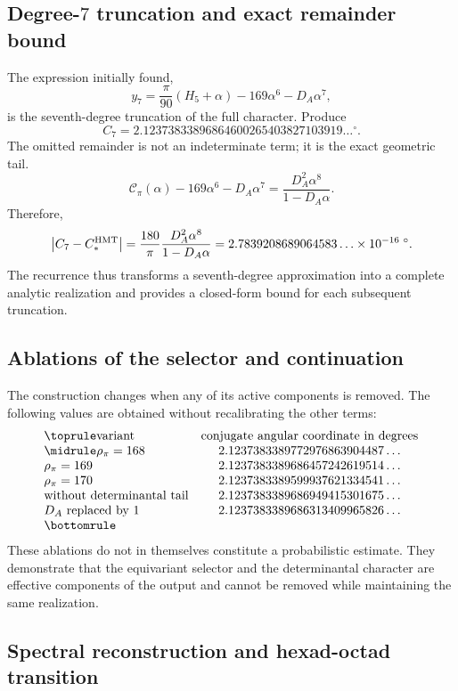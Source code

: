 \subsection{Degree-\(7\) truncation and exact remainder bound}

The expression initially found,
\[
y_7=\frac\pi{90}(H_5+\alpha)-169\alpha^6-D_A\alpha^7,
\]
is the seventh-degree truncation of the full character. Produce
\[
C_7=2.12373833896864600265403827103919\ldots{}^\circ.
\]
The omitted remainder is not an indeterminate term; it is the exact geometric tail.
\[
\mathscr C_\pi(\alpha)
-169\alpha^6-D_A\alpha^7
=\frac{D_A^2\alpha^8}{1-D_A\alpha}.
\]
Therefore,
\[
\left|C_7-C_*^{\rm HMT}\right|
=\frac{180}{\pi}\frac{D_A^2\alpha^8}{1-D_A\alpha}
=2.7839208689064583\ldots\times10^{-16}\;{}^\circ.
\]
The recurrence thus transforms a seventh-degree approximation into a
complete analytic realization and provides a closed-form bound for each
subsequent truncation.

\subsection{Ablations of the selector and continuation}

The construction changes when any of its active components is removed.
The following values are obtained without recalibrating the other terms:
\[
\begin{array}{@{}lc@{}}
\toprule
\text{variant}&\text{conjugate angular coordinate in degrees}\\
\midrule
\rho_\pi=168&2.1237383389772976863904487\ldots\\
\rho_\pi=169&2.1237383389686457242619514\ldots\\
\rho_\pi=170&2.1237383389599937621334541\ldots\\
\text{without determinantal tail}&2.1237383389686949415301675\ldots\\
D_A\text{ replaced by }1&2.1237383389686313409965826\ldots\\
\bottomrule
\end{array}
\]
These ablations do not in themselves constitute a probabilistic estimate.
They demonstrate that the equivariant selector and the determinantal character are
effective components of the output and cannot be removed while maintaining the
same realization.

\subsection{Spectral reconstruction and hexad-octad transition}

